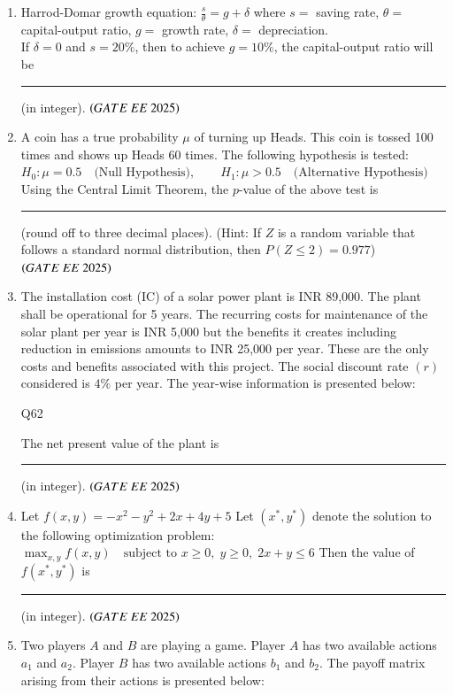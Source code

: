 \documentclass[journal,12pt,onecolumn]{IEEEtran}
\theoremstyle{remark}
\begin{document}
\begin{enumerate}
\item Harrod-Domar growth equation:
$
\frac{s}{\theta} = g + \delta
$
where $s=$ saving rate, $\theta=$ capital-output ratio, $g=$ growth rate, $\delta=$ depreciation. \\
If $\delta=0$ and $s=20\%$, then to achieve $g=10\%$, the capital-output ratio will be \rule{2cm}{0.4pt} (in integer).
\hfill $\brak{GATE\ EE\ 2025}$

\item A coin has a true probability $\mu$ of turning up Heads. This coin is tossed 100 times and shows up Heads 60 times. The following hypothesis is tested:  
$
H_0: \mu = 0.5 \quad \text{(Null Hypothesis)}, \qquad 
H_1: \mu > 0.5 \quad \text{(Alternative Hypothesis)}
$  
Using the Central Limit Theorem, the $p$-value of the above test is \rule{2cm}{0.4pt} (round off to three decimal places).  
(Hint: If $Z$ is a random variable that follows a standard normal distribution, then $P(Z \leq 2) = 0.977$)  
\hfill $\brak{GATE\ EE\ 2025}$

\item The installation cost (IC) of a solar power plant is INR 89,000. The plant shall be operational for 5 years. The recurring costs for maintenance of the solar plant per year is INR 5,000 but the benefits it creates including reduction in emissions amounts to INR 25,000 per year. These are the only costs and benefits associated with this project. The social discount rate $(r)$ considered is $4\%$ per year. The year-wise information is presented below:  

\begin{table}[H]
\centering

\caption{Q62}
\label{Q62}
\end{table}

The net present value of the plant is \rule{2cm}{0.4pt} (in integer).  
\hfill $\brak{GATE\ EE\ 2025}$

\item Let 
$
f(x,y) = -x^2 - y^2 + 2x + 4y + 5
$  
Let $(x^*, y^*)$ denote the solution to the following optimization problem:  
$
\max_{x,y} f(x,y) \quad \text{subject to } x \geq 0, \; y \geq 0, \; 2x+y \leq 6
$  
Then the value of $f(x^*,y^*)$ is \rule{2cm}{0.4pt} (in integer).  
\hfill $\brak{GATE\ EE\ 2025}$

\item Two players $A$ and $B$ are playing a game. Player $A$ has two available actions $a_1$ and $a_2$. Player $B$ has two available actions $b_1$ and $b_2$. The payoff matrix arising from their actions is presented below:  


\end{enumerate}
\end{document}
